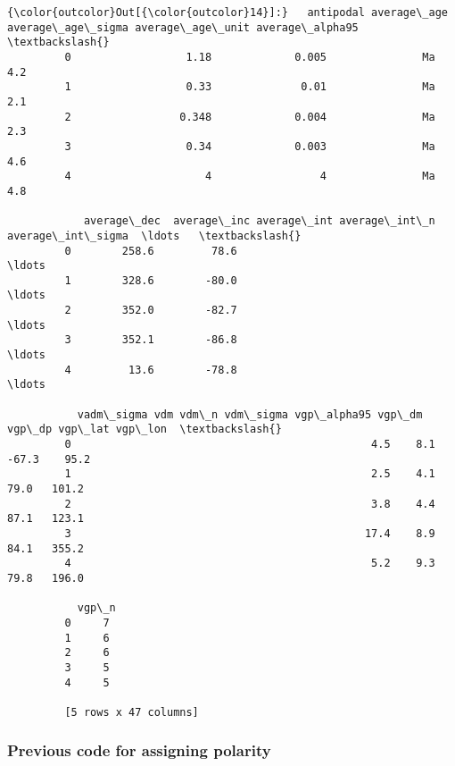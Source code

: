 \documentclass{article}
\begin{document}
            \begin{Verbatim}[commandchars=\\\{\}]
{\color{outcolor}Out[{\color{outcolor}14}]:}   antipodal average\_age average\_age\_sigma average\_age\_unit average\_alpha95  \textbackslash{}
         0                  1.18             0.005               Ma             4.2   
         1                  0.33              0.01               Ma             2.1   
         2                 0.348             0.004               Ma             2.3   
         3                  0.34             0.003               Ma             4.6   
         4                     4                 4               Ma             4.8   
         
            average\_dec  average\_inc average\_int average\_int\_n average\_int\_sigma  \ldots   \textbackslash{}
         0        258.6         78.6                                              \ldots    
         1        328.6        -80.0                                              \ldots    
         2        352.0        -82.7                                              \ldots    
         3        352.1        -86.8                                              \ldots    
         4         13.6        -78.8                                              \ldots    
         
           vadm\_sigma vdm vdm\_n vdm\_sigma vgp\_alpha95 vgp\_dm vgp\_dp vgp\_lat vgp\_lon  \textbackslash{}
         0                                               4.5    8.1   -67.3    95.2   
         1                                               2.5    4.1    79.0   101.2   
         2                                               3.8    4.4    87.1   123.1   
         3                                              17.4    8.9    84.1   355.2   
         4                                               5.2    9.3    79.8   196.0   
         
           vgp\_n  
         0     7  
         1     6  
         2     6  
         3     5  
         4     5  
         
         [5 rows x 47 columns]
\end{Verbatim}
        

    \subsubsection{Previous code for assigning polarity}
\end{document}
